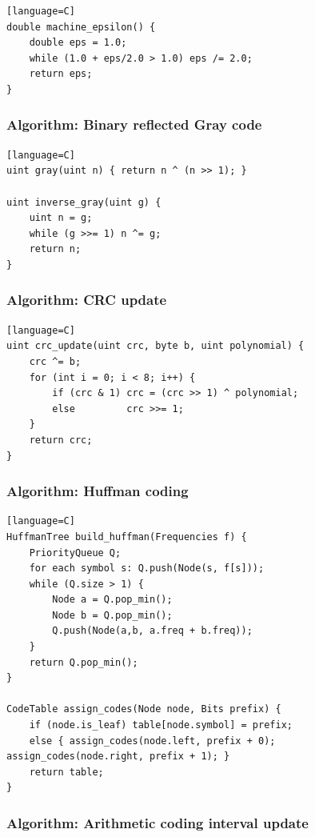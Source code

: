 \documentclass[11pt]{article}
\begin{document}
\begin{verbatim}[language=C]
double machine_epsilon() {
    double eps = 1.0;
    while (1.0 + eps/2.0 > 1.0) eps /= 2.0;
    return eps;
}
\end{verbatim}

\subsubsection{Algorithm: Binary reflected Gray code}\label{algorithm-binary-reflected-gray-code}

\begin{verbatim}[language=C]
uint gray(uint n) { return n ^ (n >> 1); }

uint inverse_gray(uint g) {
    uint n = g;
    while (g >>= 1) n ^= g;
    return n;
}
\end{verbatim}

\subsubsection{Algorithm: CRC update}\label{algorithm-crc-update}

\begin{verbatim}[language=C]
uint crc_update(uint crc, byte b, uint polynomial) {
    crc ^= b;
    for (int i = 0; i < 8; i++) {
        if (crc & 1) crc = (crc >> 1) ^ polynomial;
        else         crc >>= 1;
    }
    return crc;
}
\end{verbatim}

\subsubsection{Algorithm: Huffman coding}\label{algorithm-huffman-coding}

\begin{verbatim}[language=C]
HuffmanTree build_huffman(Frequencies f) {
    PriorityQueue Q;
    for each symbol s: Q.push(Node(s, f[s]));
    while (Q.size > 1) {
        Node a = Q.pop_min();
        Node b = Q.pop_min();
        Q.push(Node(a,b, a.freq + b.freq));
    }
    return Q.pop_min();
}

CodeTable assign_codes(Node node, Bits prefix) {
    if (node.is_leaf) table[node.symbol] = prefix;
    else { assign_codes(node.left, prefix + 0); assign_codes(node.right, prefix + 1); }
    return table;
}
\end{verbatim}

\subsubsection{Algorithm: Arithmetic coding interval update}\label{algorithm-arithmetic-coding-interval-update}
\end{document}
